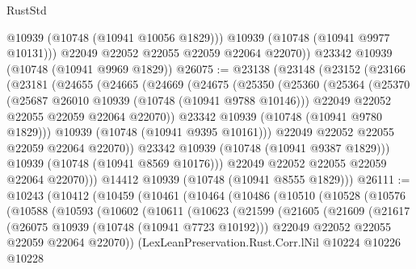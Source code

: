 \begin{lexlean}{RustStd}
\begin{coremodule}
            @10939
            (@10748 (@10941 @10056 @1829)))
          @10939
          (@10748 (@10941 @9977 @10131)))
        @22049
        @22052
        @22055
        @22059
        @22064
        @22070))
    @23342
    @10939
    (@10748 (@10941 @9969 @1829))
@26075 := @23138
    (@23148
      (@23152
        (@23166
          (@23181
            (@24655
              (@24665
                (@24669
                  (@24675
                    (@25350
                      (@25360
                        (@25364
                          (@25370
                            (@25687 @26010 @10939 (@10748 (@10941 @9788 @10146)))
                            @22049
                            @22052
                            @22055
                            @22059
                            @22064
                            @22070))
                        @23342
                        @10939
                        (@10748 (@10941 @9780 @1829)))
                      @10939
                      (@10748 (@10941 @9395 @10161)))
                    @22049
                    @22052
                    @22055
                    @22059
                    @22064
                    @22070))
                @23342
                @10939
                (@10748 (@10941 @9387 @1829)))
              @10939
              (@10748 (@10941 @8569 @10176)))
            @22049
            @22052
            @22055
            @22059
            @22064
            @22070)))
      @14412
      @10939
      (@10748 (@10941 @8555 @1829)))
@26111 := @10243
    (@10412
      (@10459
        (@10461
          (@10464
            (@10486
              (@10510
                (@10528
                  (@10576
                    (@10588
                      (@10593
                        (@10602
                          (@10611
                            (@10623
                              (@21599
                                (@21605
                                  (@21609
                                    (@21617
                                      (@26075 @10939 (@10748 (@10941 @7723 @10192)))
                                      @22049
                                      @22052
                                      @22055
                                      @22059
                                      @22064
                                      @22070))
                                  (LexLeanPreservation.Rust.Corr.lNil
                                    @10224
                                    @10226
                                    @10228

\end{coremodule}
\end{lexlean}
